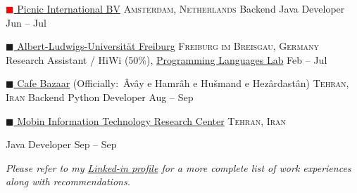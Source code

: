 \documentclass[10pt,a4paper]{article}
\newcommand{\colorsquare}[1]{\textcolor{#1}{$\blacksquare$}}
\begin{document}
\headedsection
  {\href{https://picnic.app/}{\colorsquare{red} Picnic International BV}}
  {\textsc{Amsterdam, Netherlands}} {%
  \headedsubsection
    {Backend Java Developer}
    {Jun  -- Jul }
    {}
}

\headedsection  %
  {\href{http://www.uni-freiburg.de/}{\colorsquare{carolinablue} Albert-Ludwigs-Universität Freiburg}}
  {\textsc{Freiburg im Breisgau, Germany}} {%
  \headedsubsection
    {Research Assistant / HiWi (50\%), \href{http://proglang.informatik.uni-freiburg.de}{Programming Languages Lab}}
    {Feb  -- Jul }
    {}
}

\headedsection  %
  {\href{https://en.wikipedia.org/wiki/Cafe_Bazaar}{\colorsquare{bazaar} Cafe Bazaar} (Officially:\ Âvây e Hamrâh e Hušmand e Hezârdastân)}
  {\textsc{Tehran, Iran}} {%
  \headedsubsection
    {Backend Python Developer}
    {Aug  -- Sep }
    {}
}

\headedsection
  {\href{http://mitrc.ir}{\colorsquare{camouflagegreen} Mobin Information Technology Research Center}}
  {\textsc{Tehran, Iran}} {%

  \headedsubsection
    {Java Developer}
    {Sep  -- Sep }
    {}
}

\vspace{-0.2em}
\begin{center}
  \emph{\small Please refer to my \href{http://www.linkedin.com/in/angellandros}{Linked-in profile} for a more complete list of work experiences along with recommendations.}
\end{center}

\spacedhrule{-0.2em}{-0.4em}
\end{document}
